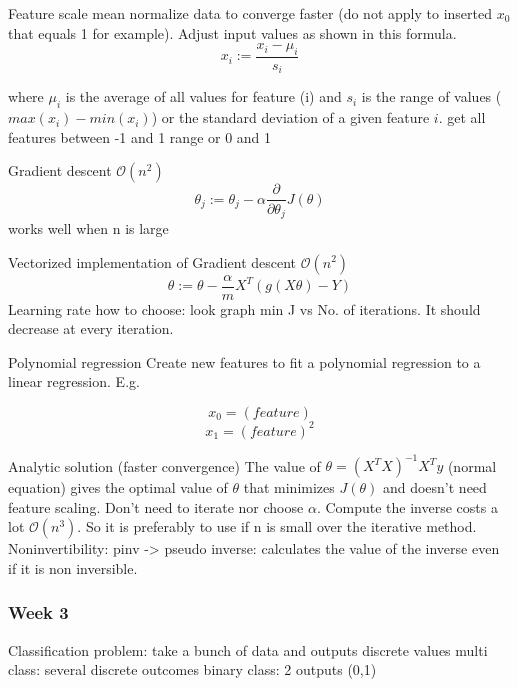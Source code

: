 \documentclass[12pt,a4paper]{report}
\begin{document}
Feature scale
	mean normalize data to converge faster (do not apply to inserted $ x_{0} $ that equals 1 for example). Adjust input values as shown in this formula.
	\begin{equation}
	x_{i} := \frac{x_{i}-\mu_{i}}{s_{i}}
	\end{equation}
	
	where $ \mu_{i} $ is the average of all values for feature (i) and $ s_{i} $ is the range of values ($ max(x_{i})-min(x_{i}) $) or the standard deviation of a given feature $ i $.
	get all features between -1 and 1 range or 0 and 1
	
Gradient descent $\mathcal{O}(n^{2})$
	\begin{equation}
	\theta_{j} := \theta_{j} - \alpha \frac{\partial}{\partial \theta_{j}}J(\theta)
	\end{equation}
	works well when n is large
	
Vectorized implementation of Gradient descent $\mathcal{O}(n^{2})$
	\begin{equation}
	\theta := \theta - \frac{\alpha}{m} X^{T}(g(X\theta)-Y)	
		\end{equation}
Learning rate
	how to choose: look graph min J vs No. of iterations. It should decrease at every iteration.

Polynomial regression
	Create new features to fit a polynomial regression to a linear regression.
	E.g.
	
	\begin{equation}
	x_{0} = (feature)
	\end{equation}
	\begin{equation}
	x_{1} = (feature)^{2}
	\end{equation}
	
	
Analytic solution (faster convergence)
	The value of $ \theta = (X^{T}X)^{-1}X^{T}y $ (normal equation) gives the optimal value of $\theta$ that minimizes $ J(\theta) $ and doesn't need feature scaling.
	Don't need to iterate nor choose $\alpha$.
	Compute the inverse costs a lot $\mathcal{O}(n^{3})$. So it is preferably to use if n is small over the iterative method.
	Noninvertibility: pinv -> pseudo inverse: calculates the value of the inverse even if it is non inversible. 
	
	\subsubsection{Week 3}
	
Classification problem: take a bunch of data and outputs discrete  values
	multi class: several discrete outcomes
	binary class: 2 outputs (0,1)
		
\end{document}
